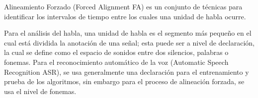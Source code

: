  



Alineamiento Forzado (Forced Alignment FA) es un conjunto de técnicas para identificar los intervalos de tiempo entre los cuales una unidad de habla ocurre.

Para el análisis del habla, una unidad de habla es el segmento más pequeño en el cual está dividida la anotación de una señal; esta puede ser a nivel de declaración, la cual se define como el espacio de sonidos entre dos silencios, palabras o fonemas. Para el reconocimiento automático de la voz (Automatic Speech Recognition ASR), se usa generalmente una declaración para el entrenamiento y prueba de los algoritmos, sin embargo para el proceso de alineación forzada, se usa el nivel de fonemas.

